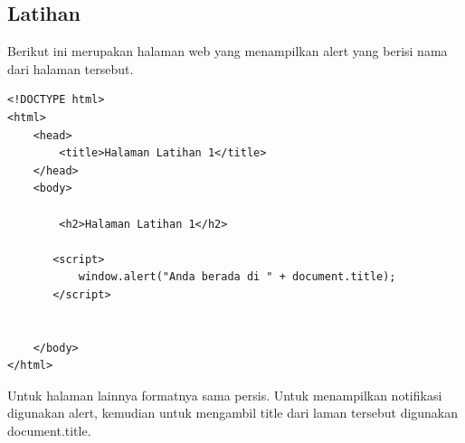 \documentclass[a4paper,12pt]{article}
\begin{document}
\subsection{Latihan}
Berikut ini merupakan halaman web yang menampilkan alert yang berisi nama dari halaman
tersebut.
\begin{lstlisting}
<!DOCTYPE html>
<html>
    <head>
        <title>Halaman Latihan 1</title>
    </head>
    <body>

        <h2>Halaman Latihan 1</h2>

       <script>
           window.alert("Anda berada di " + document.title);
       </script>


    </body>
</html>
\end{lstlisting}
Untuk halaman lainnya formatnya sama persis. Untuk menampilkan notifikasi digunakan alert, kemudian untuk mengambil
title dari laman tersebut digunakan document.title.
\end{document}
